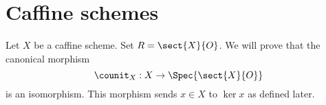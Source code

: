 \section{Caffine schemes}

Let $X$ be a caffine scheme. Set $R = \sect{X}{O}$.
We will prove that the canonical morphism \[\counit_X: X \rightarrow \Spec{\sect{X}{O}}\] is an isomorphism.
This morphism sends $x\in X$ to $\ker{x}$ as defined later.



















